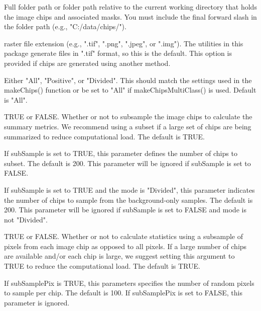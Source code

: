 \documentclass[a4paper]{book}
\begin{document}
\begin{Arguments}
\begin{ldescription}
\item[\code{folder}] Full folder path or folder path relative to the current working
directory that holds the image chips and associated masks. You must include
the final forward slash in the folder path (e.g., "C:/data/chips/").

\item[\code{extension}] raster file extension (e.g., ".tif", ".png", ".jpeg", or ".img").
The utilities in this package generate files in ".tif" format, so this is the default.
This option is provided if chips are generated using another method.

\item[\code{mode}] Either "All", "Positive", or "Divided". This should match the settings
used in the makeChips() function or be set to "All" if makeChipsMultiClass() is
used. Default is "All".

\item[\code{subSample}] TRUE or FALSE. Whether or not to subsample the image chips to
calculate the summary metrics. We recommend using a subset if a large set of
chips are being summarized to reduce computational load. The default is TRUE.

\item[\code{numChips}] If subSample is set to TRUE, this parameter defines the
number of chips to subset. The default is 200. This parameter will be ignored
if subSample is set to FALSE.

\item[\code{numChipsBack}] If subSample is set to TRUE and the mode is "Divided", this
parameter indicates the number of chips to sample from the background-only
samples. The default is 200. This parameter will be ignored if subSample is
set to FALSE and mode is not "Divided".

\item[\code{subSamplePix}] TRUE or FALSE. Whether or not to calculate statistics using
a subsample of pixels from each image chip as opposed to all pixels. If a large
number of chips are available and/or each chip is large, we suggest setting this
argument to TRUE to reduce the computational load. The default is TRUE.

\item[\code{sampsPerChip}] If subSamplePix is TRUE, this parameters specifies the
number of random pixels to sample per chip. The default is 100. If
subSamplePix is set to FALSE, this parameter is ignored.
\end{ldescription}
\end{Arguments}
\end{document}
